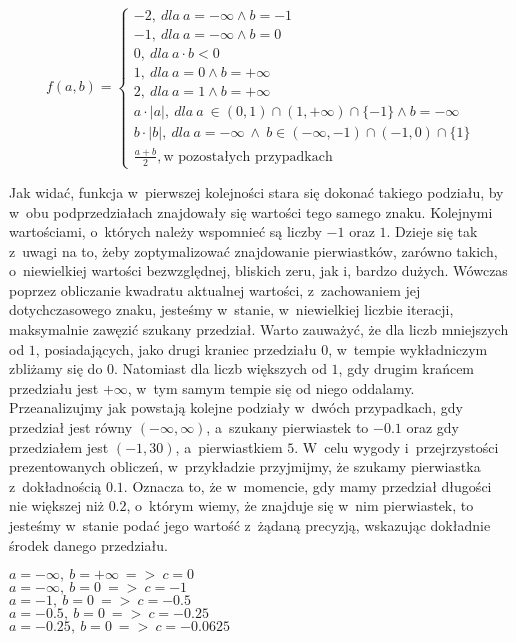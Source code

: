 \[
f(a,b)=\left\{
\begin{array}{ll}
-2,\ dla\ a=-\infty \wedge b=-1\\
-1,\ dla\ a=-\infty \wedge b=0\\
0,\ dla\ a \cdot b<0\\
1,\ dla\ a=0 \wedge b=+\infty\\
2,\ dla\ a=1 \wedge b=+\infty\\
a \cdot |a|,\ dla\ a~\in (0,1) \cap (1,+\infty) \cap \{-1\} \wedge b=-\infty\ \\
b \cdot |b|,\ dla\ a=-\infty\ \wedge \ b \in (-\infty,-1) \cap (-1,0) \cap \{1\}\\
\frac{a+b}{2},\text{w pozostałych przypadkach}
\end{array}
\right.
\]

Jak widać, funkcja w~pierwszej kolejności stara się dokonać takiego podziału, by w~obu podprzedziałach znajdowały się wartości tego samego znaku. Kolejnymi wartościami, o~których należy wspomnieć są liczby $-1$ oraz $1$. Dzieje się tak z~uwagi na to, żeby zoptymalizować znajdowanie pierwiastków, zarówno takich, o~niewielkiej wartości bezwzględnej, bliskich zeru, jak i, bardzo dużych. Wówczas poprzez obliczanie kwadratu aktualnej wartości, z~zachowaniem jej dotychczasowego znaku, jesteśmy w~stanie, w~niewielkiej liczbie iteracji, maksymalnie zawęzić szukany przedział. Warto zauważyć, że dla liczb mniejszych od $1$, posiadających, jako drugi kraniec przedziału $0$, w~tempie wykładniczym zbliżamy się do $0$. Natomiast dla liczb większych od $1$, gdy drugim krańcem przedziału jest $+\infty$, w~tym samym tempie się od niego oddalamy. Przeanalizujmy jak powstają kolejne podziały w~dwóch przypadkach, gdy przedział jest równy $(-\infty,\infty)$, a~szukany pierwiastek to $-0.1$ oraz gdy przedziałem jest $(-1,30)$, a~pierwiastkiem $5$. W~celu wygody i~przejrzystości prezentowanych obliczeń, w~przykładzie przyjmijmy, że szukamy pierwiastka z~dokładnością $0.1$. Oznacza to, że w~momencie, gdy mamy przedział długości nie większej niż $0.2$, o~którym wiemy, że znajduje się w~nim pierwiastek, to jesteśmy w~stanie podać jego wartość z~żądaną precyzją, wskazując dokładnie środek danego przedziału.

\begin{example}
	$ $ \\
	$a = -\infty,\ b = +\infty\ =>\ c=0$ \\
	$a = -\infty,\ b = 0\ =>\ c=-1$ \\
	$a = -1,\ b = 0\ =>\ c=-0.5$ \\
	$a = -0.5,\ b = 0\ =>\ c=-0.25$ \\
	$a = -0.25,\ b = 0\ =>\ c=-0.0625$
\end{example}

